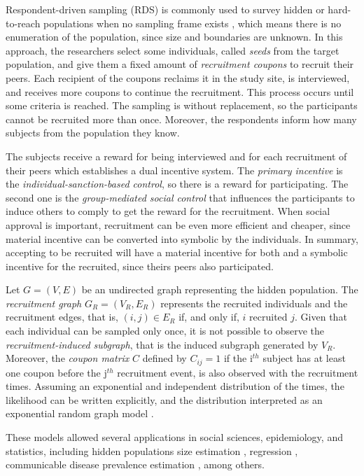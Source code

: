 Respondent-driven sampling (RDS) is commonly used to survey hidden or hard-to-reach populations when
no sampling frame exists \cite[]{heckathorn1997}, which means there is no
enumeration of the population, since size and boundaries are unknown. In this approach, the
researchers select some individuals, called {\em seeds} from the target
population, and give them a fixed amount of {\em recruitment coupons} to
recruit their peers. Each recipient of the coupons reclaims it in the study
site, is interviewed, and receives more coupons to continue the recruitment.
This process occurs until some criteria is reached. The sampling is without
replacement, so the participants cannot be recruited more than once. Moreover,
the respondents inform how many subjects from the population they know.

The subjects receive a reward for being interviewed and for each recruitment
of their peers which establishes a dual incentive system. The {\em primary incentive} is the
{\em individual-sanction-based control}, so there is a reward for
participating. The second one is the {\em group-mediated social control} that
influences the participants to induce others to comply to get the reward for the recruitment. When social approval is important, recruitment can be even
more efficient and cheaper, since material incentive can be converted into
symbolic by the individuals. In summary, accepting to be recruited will have a
material incentive for both and a symbolic incentive for the recruited, since
theirs peers also participated.

Let $G = (V,E)$ be an undirected graph representing the hidden population. The {\em recruitment graph} $G_R =
(V_R, E_R)$ represents the recruited individuals and the recruitment edges,
that is, $(i,j) \in E_R$ if, and only if, $i$ recruited $j$.
Given that each individual can be sampled only once, it is not possible to
observe the {\em recruitment-induced subgraph}, that is the induced subgraph
generated by $V_R$. Moreover, the {\em coupon matrix} $C$ defined by $C_{ij} =
1$ if the i$^{th}$ subject has at least one coupon before the j$^{th}$
recruitment event, is also observed with the recruitment times. Assuming an
exponential and independent distribution of the times, the likelihood can be
written explicitly, and the distribution interpreted as an exponential random graph
model \cite[]{crawford2016}.  

These models allowed several applications in social sciences, epidemiology,
and statistics, including hidden populations size estimation
\cite[]{crawford2018hidden}, regression \cite[]{bastos2012binary}, communicable
disease prevalence estimation \cite[]{albuquerque2009avaliaccao}, among others.

